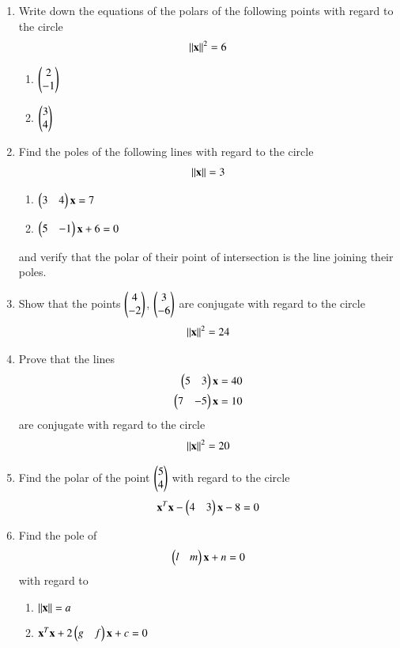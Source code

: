 \renewcommand{\theequation}{\theenumi}
\begin{enumerate}[label=\arabic*.,ref=\thesubsection.\theenumi]
\item Write down the equations of the polars of the following points with regard to the circle 
\begin{align}
\left\lVert\mathbf{x}\right\rVert^2=6
\end{align}

\begin{enumerate}
\item
$
\begin{pmatrix}2\\-1\end{pmatrix}
$
\item
$
\begin{pmatrix}3\\4\end{pmatrix}
$
\end{enumerate}
\item Find the poles of the following lines with regard to the circle 
\begin{align}
\left\lVert\mathbf{x}\right\rVert=3
\end{align}

\begin{enumerate}
\item
$
\begin{pmatrix}3 & 4\end{pmatrix}\mathbf{x}=7
$
\item
$
\begin{pmatrix}5 & -1\end{pmatrix}\mathbf{x}+6=0
$
\end{enumerate}
and verify that the polar of their point of intersection is the line joining their poles.
\item Show that the points $\begin{pmatrix}4\\-2\end{pmatrix}$, $\begin{pmatrix}3\\-6\end{pmatrix}$ are conjugate with regard to the circle
\begin{align}
\left\lVert\mathbf{x}\right\rVert^2=24
\end{align}
\item Prove that the lines 
\begin{align}
\begin{pmatrix}5 & 3\end{pmatrix}\mathbf{x}=40
\\
\begin{pmatrix}7 & -5\end{pmatrix}\mathbf{x}=10
\end{align}
are conjugate with regard to the circle
\begin{align}
\left\lVert\mathbf{x}\right\rVert^2=20
\end{align}
\renewcommand{\theequation}{\theenumi}
\item Find the polar of the point $\begin{pmatrix}5\\4\end{pmatrix}$ with regard to the circle
\begin{align}
\mathbf{x}^T\mathbf{x}-\begin{pmatrix}4 & 3\end{pmatrix}\mathbf{x}-8 = 0
\end{align}
\item Find the pole of 
\begin{align}
\begin{pmatrix}l & m\end{pmatrix}\mathbf{x}+n = 0
\end{align}
with regard to
\begin{enumerate}
\item
$
\left\lVert\mathbf{x}\right\rVert=a
$
\item
$
\mathbf{x}^T\mathbf{x}+2\begin{pmatrix}g & f\end{pmatrix}\mathbf{x}+c = 0
$


\end{enumerate}
\end{enumerate}
